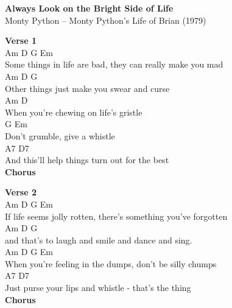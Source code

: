 \documentclass[a4paper]{article}
\begin{document}
    \begin{center}
        \textbf{Always Look on the Bright Side of Life}
        ~\\
        Monty Python -- Monty Python's Life of Brian (1979)
    \end{center}
    {
        \scriptsize
        \textbf{Verse 1}
        ~\\
        {
            \cutive
            \obeyspaces
     Am                 D             G               Em
\\
Some things in life are bad, they can really make you mad
\\
      Am                   D         G
\\
Other things just make you swear and curse
\\
            Am                D
\\
When you're chewing on life's gristle
\\
      G               Em
\\
Don't grumble, give a whistle
\\
    A7                                   D7
\\
And this'll help things turn out for the best
\\

        }
        \textbf{Chorus}
        ~\\
        {
            \cutive
            \obeyspaces

        }
        \textbf{Verse 2}
        ~\\
        {
            \cutive
            \obeyspaces
   Am               D               G                Em
\\
If life seems jolly rotten, there's something you've forgotten
\\
              Am                  D         G
\\
and that's to laugh and smile and dance and sing.
\\
            Am             D               G     Em
\\
When you're feeling in the dumps, don't be silly chumps
\\
     A7                                       D7
\\
Just purse your lips and whistle - that's the thing
\\

        }
        \textbf{Chorus}
        ~\\
        {
            \cutive
            \obeyspaces

}}
\end{document}

